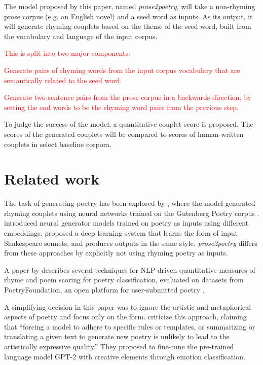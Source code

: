 \documentclass[11pt,a4paper]{article}
\newenvironment{tight_enumerate}{
\begin{enumerate}
\setlength{\itemsep}{0pt}
\setlength{\parskip}{0pt}
}{\end{enumerate}}
\begin{document}
The model proposed by this paper, named \textit{prose2poetry}, will take a non-rhyming prose corpus (e.g. an English novel) and a seed word as inputs. As its output, it will generate rhyming couplets based on the theme of the seed word, built from the vocabulary and language of the input corpus.

\textcolor{red}{This is split into two major components:
\begin{tight_enumerate}
	\vspace{-0.5em}
	\item
		Generate pairs of rhyming words from the input corpus vocabulary that are semantically related to the seed word.
	\item
		Generate two-sentence pairs from the prose corpus in a backwards direction, by setting the end words to be the rhyming word pairs from the previous step.
\end{tight_enumerate}
\vspace{-0.5em}
}

To judge the success of the model, a quantitative couplet score is proposed. The scores of the generated couplets will be compared to scores of human-written couplets in select baseline corpora.

\section{Related work}
\label{sec:related}

The task of generating poetry has been explored by \citet{cole}, where the model generated rhyming couplets using neural networks trained on the Gutenberg Poetry corpus \cite{gutenbergpoetry}. \citet{hopkins-kiela-2017} introduced neural generator models trained on poetry as inputs using different embeddings. \citet{Xie2017DeepP} proposed a deep learning system that learns the form of input Shakespeare sonnets, and produces outputs in the same style. \textit{prose2poetry} differs from these approaches by explicitly not using rhyming poetry as inputs.

A paper by \citet{keswarani} describes several techniques for NLP-driven quantitative measures of rhyme and poem scoring for poetry classification, evaluated on datasets from PoetryFoundation, an open platform for user-submitted poetry \cite*{poetryfoundation}.

A simplifying decision in this paper was to ignore the artistic and metaphorical aspects of poetry and focus only on the form. \citet{bena2020introducing} criticize this approach, claiming that ``forcing a model to adhere to specific rules or templates, or summarizing or translating a given text to generate new poetry is unlikely to lead to the artistically expressive quality.'' They proposed to fine-tune the pre-trained language model GPT-2 with creative elements through emotion classification.
\end{document}
